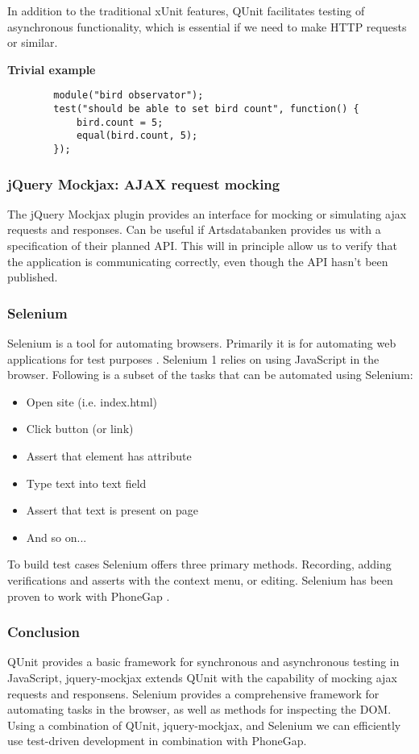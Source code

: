 	In addition to the traditional xUnit features, QUnit facilitates testing of
	asynchronous functionality, which is essential if we need to make HTTP
	requests or similar.

	\textbf{Trivial example}

	\begin{lstlisting}
		module("bird observator");
		test("should be able to set bird count", function() {
			bird.count = 5;
			equal(bird.count, 5);
		});
	\end{lstlisting}

\subsubsection{jQuery Mockjax: AJAX request mocking}

	The jQuery Mockjax plugin provides an interface for mocking or simulating
	ajax requests and responses. \cite{github:jquery-mockjax} Can be useful if Artsdatabanken provides us
	with a specification of their planned API. This will in principle allow us
	to verify that the application is communicating correctly, even though the
	API hasn't been published.

\subsubsection{Selenium}

	Selenium is a tool for automating browsers. Primarily it is for automating
	web applications for test purposes \cite{seleniumhq:home}. Selenium 1 relies
	on using JavaScript in the browser. Following is a subset of the tasks that
	can be automated using Selenium:

	\begin{itemize}
		\item Open site (i.e. index.html)
		\item Click button (or link)
		\item Assert that element has attribute
		\item Type text into text field
		\item Assert that text is present on page
		\item And so on...
	\end{itemize}

	To build test cases Selenium offers three primary methods. Recording, adding
	verifications and asserts with the context menu, or editing. Selenium has
	been proven to work with PhoneGap \cite{phonegap:automatic-test-cases}.

\subsubsection{Conclusion}

	QUnit provides a basic framework for synchronous and asynchronous testing in
	JavaScript, jquery-mockjax extends QUnit with the capability of mocking ajax
	requests and responsens. Selenium provides a comprehensive framework for
	automating tasks in the browser, as well as methods for inspecting the DOM.
	Using a combination of QUnit, jquery-mockjax, and Selenium we can
	efficiently use test-driven development in combination with PhoneGap.
